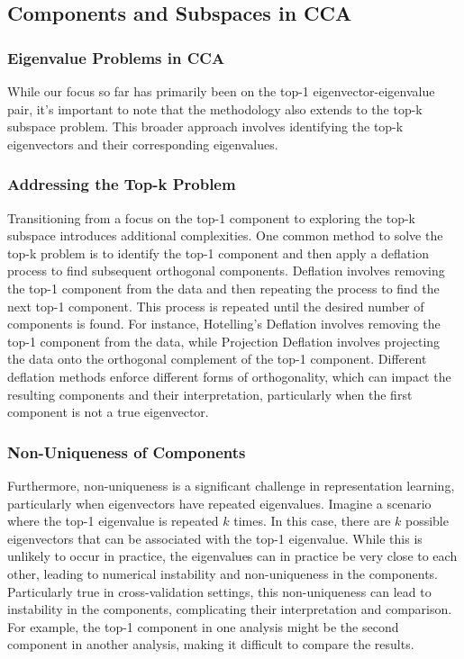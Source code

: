 \subsection{Components and Subspaces in CCA}

\subsubsection{Eigenvalue Problems in CCA}

While our focus so far has primarily been on the top-1 eigenvector-eigenvalue pair, it's important to note that the methodology also extends to the top-k subspace problem.
This broader approach involves identifying the top-k eigenvectors and their corresponding eigenvalues.

\subsubsection{Addressing the Top-k Problem}

Transitioning from a focus on the top-1 component to exploring the top-k subspace introduces additional complexities. One common method to solve the top-k problem is to identify the top-1 component and then apply a deflation process to find subsequent orthogonal components.
Deflation involves removing the top-1 component from the data and then repeating the process to find the next top-1 component. This process is repeated until the desired number of components is found.
For instance, Hotelling's Deflation \citep{hotelling1933analysis} involves removing the top-1 component from the data, while Projection Deflation \citep{mackey2008deflation} involves projecting the data onto the orthogonal complement of the top-1 component.
Different deflation methods enforce different forms of orthogonality, which can impact the resulting components and their interpretation, particularly when the first component is not a true eigenvector.

\subsubsection{Non-Uniqueness of Components}

Furthermore, non-uniqueness is a significant challenge in representation learning, particularly when eigenvectors have repeated eigenvalues. Imagine a scenario where the top-1 eigenvalue is repeated \(k\) times. In this case, there are \(k\) possible eigenvectors that can be associated with the top-1 eigenvalue. While this is unlikely to occur in practice, the eigenvalues can in practice be very close to each other, leading to numerical instability and non-uniqueness in the components. Particularly true in cross-validation settings, this non-uniqueness can lead to instability in the components, complicating their interpretation and comparison.
For example, the top-1 component in one analysis might be the second component in another analysis, making it difficult to compare the results.

